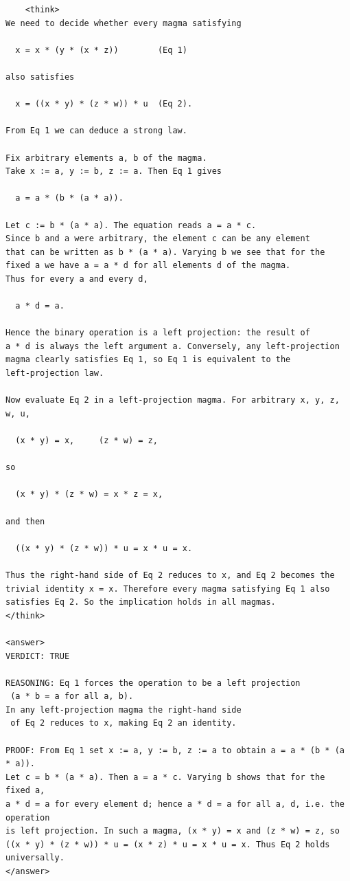 \documentclass{article}
\begin{document}
\begin{verbatim}
    <think>
We need to decide whether every magma satisfying

  x = x * (y * (x * z))        (Eq 1)

also satisfies

  x = ((x * y) * (z * w)) * u  (Eq 2).

From Eq 1 we can deduce a strong law.

Fix arbitrary elements a, b of the magma.
Take x := a, y := b, z := a. Then Eq 1 gives

  a = a * (b * (a * a)).

Let c := b * (a * a). The equation reads a = a * c.
Since b and a were arbitrary, the element c can be any element
that can be written as b * (a * a). Varying b we see that for the
fixed a we have a = a * d for all elements d of the magma.
Thus for every a and every d,

  a * d = a.

Hence the binary operation is a left projection: the result of
a * d is always the left argument a. Conversely, any left‑projection
magma clearly satisfies Eq 1, so Eq 1 is equivalent to the
left‑projection law.

Now evaluate Eq 2 in a left‑projection magma. For arbitrary x, y, z, w, u,

  (x * y) = x,     (z * w) = z,

so

  (x * y) * (z * w) = x * z = x,

and then

  ((x * y) * (z * w)) * u = x * u = x.

Thus the right‑hand side of Eq 2 reduces to x, and Eq 2 becomes the
trivial identity x = x. Therefore every magma satisfying Eq 1 also
satisfies Eq 2. So the implication holds in all magmas.
</think>

<answer>
VERDICT: TRUE

REASONING: Eq 1 forces the operation to be a left projection
 (a * b = a for all a, b).
In any left‑projection magma the right‑hand side
 of Eq 2 reduces to x, making Eq 2 an identity.

PROOF: From Eq 1 set x := a, y := b, z := a to obtain a = a * (b * (a * a)).
Let c = b * (a * a). Then a = a * c. Varying b shows that for the fixed a,
a * d = a for every element d; hence a * d = a for all a, d, i.e. the operation
is left projection. In such a magma, (x * y) = x and (z * w) = z, so
((x * y) * (z * w)) * u = (x * z) * u = x * u = x. Thus Eq 2 holds universally.
</answer>
\end{verbatim}
\end{document}
